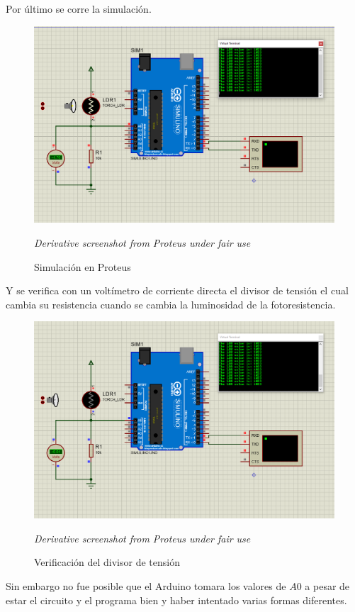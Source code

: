 \documentclass{article}
\begin{document}
Por último se corre la simulación.

\begin{figure}[H]
\centering
\includegraphics[width=0.3\paperwidth]{images/sim-1}
\caption{Simulación en Proteus}\footnotesize
\textit{Derivative screenshot from Proteus under fair use}
\end{figure}

Y se verifica con un voltímetro de corriente directa el divisor de tensión el
cual cambia su resistencia cuando se cambia la luminosidad de la
fotoresistencia.

\begin{figure}[H]
\centering
\includegraphics[width=0.3\paperwidth]{images/sim-2}
\caption{Verificación del divisor de tensión}\footnotesize
\textit{Derivative screenshot from Proteus under fair use}
\end{figure}

Sin embargo no fue posible que el Arduino tomara los valores de $A0$ a pesar
de estar el circuito y el programa bien y haber intentado varias formas
diferentes.
\end{document}
